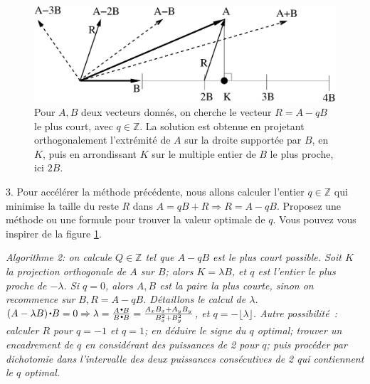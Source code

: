\documentclass[11pt]{article}
\def\Z{\mathbb Z}
\begin{document}
{{{\medskip
\else
\fi

}
}
{
\begin{figure}
\begin{center}
\includegraphics[width=0.8\linewidth]{porgo.eps}
\end{center}
\caption{\label{portho} Pour $A, B$ deux vecteurs donnés, on cherche le vecteur $R=A-qB$ le plus court, avec $q\in\Z$. La solution est obtenue en projetant orthogonalement l'extrémité de $A$ sur la droite supportée par $B$, en $K$,
puis en  arrondissant $K$ sur le  multiple entier de $B$ le plus proche, ici $2B$.}
\end{figure}
}

3. Pour accélérer la méthode précédente, nous allons calculer l'entier $q\in \Z$ qui minimise la taille du reste $R$ dans $A=qB+R \Rightarrow  R=A-qB$.
Proposez une méthode ou une formule pour trouver la valeur optimale de $q$.
Vous pouvez vous inspirer de la figure \ref{portho}.

{
\ifcorrige

{
\medskip
{\it Algorithme 2: on calcule $Q\in \Z$ tel que $A-qB$ est le plus court possible. 
Soit $K$ la projection orthogonale de $A$ sur $B$; alors $K=\lambda B$, et
$q$ est l'entier le plus proche de $-\lambda$.  
Si 
$q=0$, alors $A, B$ est la paire la plus courte, sinon on recommence sur
$B, R=A-qB$.
Détaillons le calcul de $\lambda$. $(A-\lambda B) \smallbullet B=0 \Rightarrow \lambda=\frac{A \smallbullet B}{ B \smallbullet B}=\frac{A_x B_x + A_y B_y}{B_x^ 2 +B_y^ 2}$, et $q= - \lfloor \lambda \rfloor$.
Autre possibilité~: calculer $R$ pour $q= -1$ et $q=1$; en déduire le signe du $q$ optimal; trouver un encadrement de $q$ en considérant des puissances de 2 pour $q$; puis procéder par dichotomie dans l'intervalle des deux puissances consécutives de 2 qui contiennent le $q$ optimal.
}

\medskip
}
\else
\fi
}

}
\end{document}
